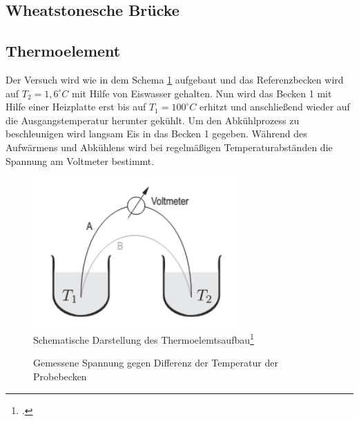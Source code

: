 \subsection{Wheatstonesche Brücke}
\subsection{Thermoelement}
Der Versuch wird wie in dem Schema \ref{fig:Thermoaufbau} aufgebaut und das Referenzbecken wird auf $T_2=1,6^\circ C$ mit Hilfe von Eiswasser gehalten. Nun wird das Becken 1 mit Hilfe einer Heizplatte erst bis auf $T_1=100^\circ C$ erhitzt und anschließend wieder auf die Ausgangstemperatur herunter gekühlt. Um den Abkühlprozess zu beschleunigen wird langsam Eis in das Becken 1 gegeben. Während des Aufwärmens und Abkühlens wird bei regelmäßigen Temperaturabständen die Spannung am Voltmeter bestimmt.
\begin{figure}[htbp] 
  \centering
	\includegraphics[width=0.7\textwidth]{Thermoaufbau.png}
	\caption{Schematische Darstellung des Thermoelemtsaufbau\footcite{anleitung-ws2014}}
  \label{fig:Thermoaufbau}
\end{figure}
\begin{figure}[H]
  \centering
  \caption{Gemessene Spannung gegen Differenz der Temperatur der Probebecken}
  \label{fig:Thermo}
\end{figure}
